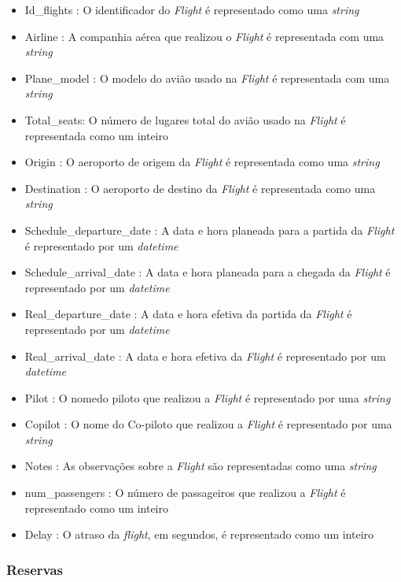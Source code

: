 \documentclass[11pt]{article}
\begin{document}
     \begin{itemize}
        \item Id_flights : O identificador do \textit{Flight} é representado como uma \textit{string}
        \item Airline : A companhia aérea que realizou o \textit{Flight} é representada com uma \textit{string}
        \item Plane_model : O modelo do avião usado na \textit{Flight} é representada com uma \textit{string}
        \item Total_seats: O número de lugares total do avião usado na \textit{Flight} é representada como um inteiro
        \item Origin : O aeroporto de origem da \textit{Flight} é representada como uma \textit{string}
        \item Destination : O aeroporto de destino da \textit{Flight} é representada como uma \textit{string}
        \item Schedule_departure_date : A data e hora planeada para a partida da \textit{Flight} é representado por um \textit{datetime}
        \item Schedule_arrival_date :  A data e hora planeada para a chegada da \textit{Flight} é representado por um \textit{datetime}
        \item Real_departure_date : A data e hora efetiva da partida da \textit{Flight} é representado por um \textit{datetime} 
        \item Real_arrival_date : A data e hora efetiva da \textit{Flight} é representado por um \textit{datetime} 
        \item Pilot : O nomedo  piloto que realizou a \textit{Flight} é representado por uma \textit{string}
        \item Copilot : O nome do Co-piloto que realizou a \textit{Flight} é representado por uma \textit{string}
        \item Notes : As observações sobre a \textit{Flight} são representadas como uma \textit{string}
        \item num_passengers : O número de passageiros que realizou a \textit{Flight} é representado como um inteiro
        \item Delay : O atraso da \textit{flight}, em segundos, é representado como um inteiro
    \end{itemize}
\subsubsection{Reservas}
\end{document}
